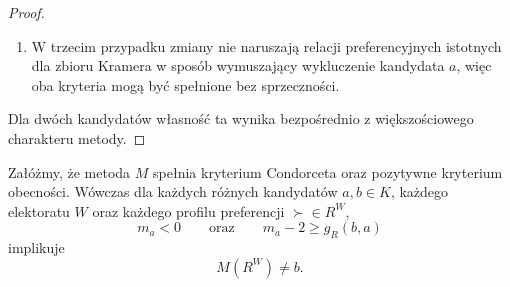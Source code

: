 \documentclass[12pt,a4paper]{mwrep}
\begin{document}
\begin{proof}
\begin{enumerate}[\text{Ad} 1.]
			Oznacza to, że kandydat $c$ nie może wyprzedzić kandydata $a$ w rankingu wartości $m_k$, a więc nie może wejść do zbioru Kramera, jeśli wcześniej do niego nie należał. W szczególności dodanie nowego wyborcy nie prowadzi do wykluczenia kandydata $a$ z $K^\ast$, a metoda pozostaje zgodna zarówno z pozytywnym, jak i negatywnym kryterium obecności.
			
			\item W trzecim przypadku zmiany nie naruszają relacji preferencyjnych istotnych dla zbioru Kramera w sposób wymuszający wykluczenie kandydata \(a\), więc oba kryteria mogą być spełnione bez sprzeczności.
		\end{enumerate}

		Dla dwóch kandydatów własność ta wynika bezpośrednio z większościowego charakteru metody.
	\end{proof}

	\begin{lemma}\label{lem:condorcet_obecnosc}
		Załóżmy, że metoda \(M\) spełnia kryterium Condorceta oraz pozytywne kryterium obecności. Wówczas dla każdych różnych kandydatów \(a,b \in K\), każdego elektoratu \(W\) oraz każdego profilu preferencji \(\succ \in R^W\),
		\[
		m_a < 0
		\qquad \text{oraz} \qquad
		m_a - 2 \geq g_R(b,a)
		\]
		implikuje
		\[
		M(R^{W}) \neq b.
		\]
	\end{lemma}
	
\end{document}
